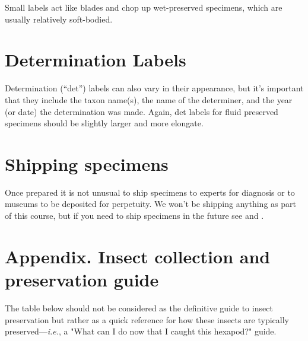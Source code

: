 \documentclass[letterpaper, 11pt]{article}
\newenvironment{labelfontsmall}{\fontfamily{phv}\selectfont}{\par}%
\begin{document}
\hfill\begin{minipage}{\dimexpr\textwidth-1cm}
\begin{labelfontsmall}
\scriptsize 
{}
\end{labelfontsmall}
\xdef\tpd{\the\prevdepth}
\end{minipage}
\normalsize\vspace{5mm}

\noindent{}Small labels act like blades and chop up wet-preserved specimens, which are usually relatively soft-bodied.

\section*{Determination Labels}
Determination (``det'') labels can also vary in their appearance, but it's important that they include the taxon name(s), the name of the determiner, and the year (or date) the determination was made. Again, det labels for fluid preserved specimens should be slightly larger and more elongate.\\

\hfill\begin{minipage}{\dimexpr\textwidth-1cm}
\begin{labelfontsmall}
\tiny 
{}
\end{labelfontsmall}
\xdef\tpd{\the\prevdepth}
\end{minipage}
\normalsize\vspace{2mm}


\section*{Shipping specimens}
Once prepared it is not unusual to ship specimens to experts for diagnosis or to museums to be deposited for perpetuity. We won't be shipping anything as part of this course, but if you need to ship specimens in the future see \cite{packinginsects} and \cite{MacraeWebpage}.

\FloatBarrier



\clearpage
\section*{Appendix. Insect collection and preservation guide}
The table below should not be considered as the definitive guide to insect preservation but rather as a quick reference for how these insects are typically preserved---\textit{i.e.}, a "What can I do now that I caught this hexapod?" guide.
\end{document}
